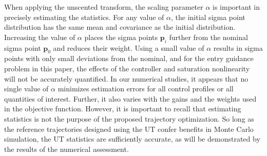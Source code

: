 \documentclass[journal ]{new-aiaa}
\newcommand{\param}{\ensuremath{\mathbf{p}}}
\begin{document}
When applying the unscented transform, the scaling parameter $\alpha$ is important in precisely estimating the statistics. For any value of $\alpha$, the initial sigma point distribution has the same mean and covariance as the initial distribution. Increasing the value of $\alpha$ places the sigma points $\param_i$ further from the nominal sigma point $\param_0$ and reduces their weight. Using a small value of $\alpha$ results in sigma points with only small deviations from the nominal, and for the entry guidance problem in this paper, the effects of the controller and saturation nonlinearity will not be accurately quantified. In our numerical studies, it appears that no single value of $\alpha$ minimizes estimation errors for all control profiles or all quantities of interest. Further, it also varies with the gains and the weights used in the objective function. 
However, it is important to recall that estimating statistics is not the purpose of the proposed trajectory optimization. So long as the reference trajectories designed using the UT confer benefits in Monte Carlo simulation, the UT statistics are sufficiently accurate, as will be demonstrated by the results of the numerical assessment. 
\end{document}
